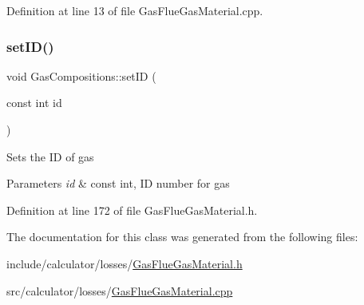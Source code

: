 Definition at line 13 of file Gas\+Flue\+Gas\+Material.\+cpp.

\mbox{\label{class_gas_compositions_a9fc3ebfcbda7134b67ed76a39b4c94cc}} 
\subsubsection{\texorpdfstring{set\+I\+D()}{setID()}}
{\footnotesize\ttfamily void Gas\+Compositions\+::set\+ID (\begin{DoxyParamCaption}\item[{const int}]{id }\end{DoxyParamCaption})\hspace{0.3cm}{\ttfamily [inline]}}

Sets the ID of gas


\begin{DoxyParams}{Parameters}
{\em id} & const int, ID number for gas \\
\hline
\end{DoxyParams}


Definition at line 172 of file Gas\+Flue\+Gas\+Material.\+h.



The documentation for this class was generated from the following files\+:\begin{DoxyCompactItemize}
\item 
include/calculator/losses/\hyperlink{_gas_flue_gas_material_8h}{Gas\+Flue\+Gas\+Material.\+h}\item 
src/calculator/losses/\hyperlink{_gas_flue_gas_material_8cpp}{Gas\+Flue\+Gas\+Material.\+cpp}\end{DoxyCompactItemize}
